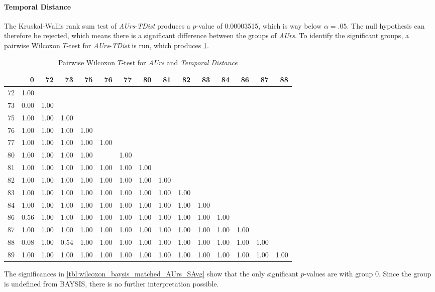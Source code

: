 \paragraph{Temporal Distance}
The Kruskal-Wallis rank sum test of \textit{AUrs}-\textit{TDist} produces a $p$-value of 0.00003515, which is way below $\alpha=.05$. The null hypothesis can therefore be rejected, which means there is a significant difference between the groups of \textit{AUrs}. To identify the significant groups, a pairwise Wilcoxon $T$-test for \textit{AUrs}-\textit{TDist} is run, which produces \cref{tbl:wilcoxon_baysis_matched_AUrs_TDist}.
\begin{table}[ht]
	\tiny
	\centering
	\begin{tabular}{rrrrrrrrrrrrrrr}
        \toprule
        & 0 & 72 & 73 & 75 & 76 & 77 & 80 & 81 & 82 & 83 & 84 & 86 & 87 & 88 \\ 
        \midrule
        72 & 1.00 &  &  &  &  &  &  &  &  &  &  &  &  &  \\ 
        73 & 0.00 & 1.00 &  &  &  &  &  &  &  &  &  &  &  &  \\ 
        75 & 1.00 & 1.00 & 1.00 &  &  &  &  &  &  &  &  &  &  &  \\ 
        76 & 1.00 & 1.00 & 1.00 & 1.00 &  &  &  &  &  &  &  &  &  &  \\ 
        77 & 1.00 & 1.00 & 1.00 & 1.00 & 1.00 &  &  &  &  &  &  &  &  &  \\ 
        80 & 1.00 & 1.00 & 1.00 & 1.00 &  & 1.00 &  &  &  &  &  &  &  &  \\ 
        81 & 1.00 & 1.00 & 1.00 & 1.00 & 1.00 & 1.00 & 1.00 &  &  &  &  &  &  &  \\ 
        82 & 1.00 & 1.00 & 1.00 & 1.00 & 1.00 & 1.00 & 1.00 & 1.00 &  &  &  &  &  &  \\ 
        83 & 1.00 & 1.00 & 1.00 & 1.00 & 1.00 & 1.00 & 1.00 & 1.00 & 1.00 &  &  &  &  &  \\ 
        84 & 1.00 & 1.00 & 1.00 & 1.00 & 1.00 & 1.00 & 1.00 & 1.00 & 1.00 & 1.00 &  &  &  &  \\ 
        86 & 0.56 & 1.00 & 1.00 & 1.00 & 1.00 & 1.00 & 1.00 & 1.00 & 1.00 & 1.00 & 1.00 &  &  &  \\ 
        87 & 1.00 & 1.00 & 1.00 & 1.00 & 1.00 & 1.00 & 1.00 & 1.00 & 1.00 & 1.00 & 1.00 & 1.00 &  &  \\ 
        88 & 0.08 & 1.00 & 0.54 & 1.00 & 1.00 & 1.00 & 1.00 & 1.00 & 1.00 & 1.00 & 1.00 & 1.00 & 1.00 &  \\ 
        89 & 1.00 & 1.00 & 1.00 & 1.00 & 1.00 & 1.00 & 1.00 & 1.00 & 1.00 & 1.00 & 1.00 & 1.00 & 1.00 & 1.00 \\ 
        \bottomrule
	  \end{tabular}
	\caption{Pairwise Wilcoxon $T$-test for \textit{AUrs} and \textit{Temporal Distance}}
	\label{tbl:wilcoxon_baysis_matched_AUrs_TDist}
\end{table}
The significances in \cref{tbl:wilcoxon_baysis_matched_AUrs_SAvg} show that the only significant $p$-values are with group 0. Since the group is undefined from BAYSIS, there is no further interpretation possible.

